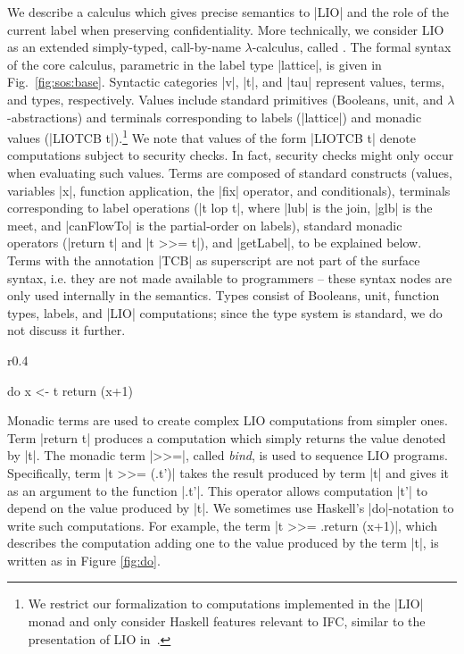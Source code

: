We describe a calculus which gives precise semantics to |LIO| and the role of
the current label when preserving confidentiality. More technically, we consider
LIO as an extended simply-typed, call-by-name $\lambda$-calculus, called \lio.
%
The formal syntax of the core \lio{} calculus, parametric in the label
type |lattice|, is given in Fig.~\ref{fig:sos:base}.
%
Syntactic categories |v|, |t|, and |tau| represent values, terms, and
types, respectively.
%
Values include standard primitives (Booleans, unit, and $\lambda$-abstractions)
and terminals corresponding to labels (|lattice|) and monadic values (|LIOTCB
t|).\footnote{ We restrict our formalization to computations implemented in the
  |LIO| monad and only consider Haskell features relevant to IFC, similar to the
  presentation of LIO in~\cite{stefan:lio,stefan:addressing-covert}.  } We note
that values of the form |LIOTCB t| denote computations subject to security
checks. In fact, security checks might only occur when evaluating such values.
%
Terms are composed of standard constructs (values, variables |x|, function
application, the |fix| operator, and conditionals), terminals corresponding to
label operations (|t lop t|, where |lub| is the join, |glb| is the meet, and
|canFlowTo| is the partial-order on labels), standard monadic operators (|return
t| and |t >>= t|), and |getLabel|, to be explained below.
%
Terms with the annotation |TCB| as superscript are not part of the surface
syntax, i.e. they are not made available to programmers -- these syntax nodes
are only used internally in the semantics.
%
Types consist of Booleans, unit, function types, labels, and |LIO|
computations; since the \lio{} type system is standard, we do not
discuss it further.

\begin{wrapfigure}{r}{0.4\columnwidth}
\vspace{-15pt}
\begin{code}
do  x <- t 
    return (x+1) 
\end{code}
\vspace{-15pt}
\caption{\label{fig:do}|do|-notation}
\end{wrapfigure}
Monadic terms are used to create complex LIO computations from simpler
ones. Term |return t| produces a computation which simply returns the value
denoted by |t|. The monadic term |>>=|, called \emph{bind}, is used to sequence
LIO programs. Specifically, term |t >>= (\x.t')| takes the result produced by
term |t| and gives it as an argument to the function |\x.t'|.  This operator
allows computation |t'| to depend on the value produced by |t|.  We sometimes
use Haskell’s |do|-notation to write such computations. For example, the term |t
>>= \x.return (x+1)|, which describes the computation adding one to the value
produced by the term |t|, is written as in Figure \ref{fig:do}.

